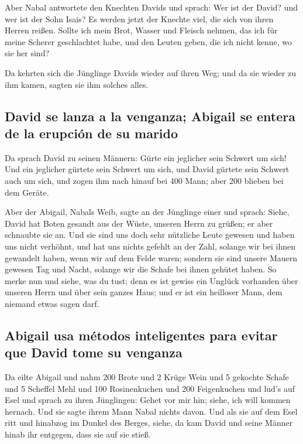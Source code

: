  Aber Nabal antwortete den Knechten Davids und sprach:
Wer ist der David? und wer ist der Sohn Isais? Es werden jetzt der
Knechte viel, die sich von ihren Herren reißen.  Sollte
ich mein Brot, Wasser und Fleisch nehmen, das ich für meine Scherer
geschlachtet habe, und den Leuten geben, die ich nicht kenne, wo sie her
sind?

 Da kehrten sich die Jünglinge Davids wieder auf ihren
Weg; und da sie wieder zu ihm kamen, sagten sie ihm solches alles.

\hypertarget{david-se-lanza-a-la-venganza-abigail-se-entera-de-la-erupciuxf3n-de-su-marido}{%
\subsection{David se lanza a la venganza; Abigail se entera de la
erupción de su
marido}\label{david-se-lanza-a-la-venganza-abigail-se-entera-de-la-erupciuxf3n-de-su-marido}}

 Da sprach David zu seinen Männern: Gürte ein jeglicher
sein Schwert um sich! Und ein jeglicher gürtete sein Schwert um sich,
und David gürtete sein Schwert auch um sich, und zogen ihm nach hinauf
bei 400 Mann; aber 200 blieben bei dem Geräte.

 Aber der Abigail, Nabals Weib, sagte an der Jünglinge
einer und sprach: Siehe, David hat Boten gesandt aus der Wüste, unseren
Herrn zu grüßen; er aber schnaubte sie an.  Und sie sind
uns doch sehr nützliche Leute gewesen und haben uns nicht verhöhnt, und
hat uns nichts gefehlt an der Zahl, solange wir bei ihnen gewandelt
haben, wenn wir auf dem Felde waren;  sondern sie sind
unsere Mauern gewesen Tag und Nacht, solange wir die Schafe bei ihnen
gehütet haben.  So merke nun und siehe, was du tust; denn
es ist gewiss ein Unglück vorhanden über unseren Herrn und über sein
ganzes Haus; und er ist ein heilloser Mann, dem niemand etwas sagen
darf.

\hypertarget{abigail-usa-muxe9todos-inteligentes-para-evitar-que-david-tome-su-venganza}{%
\subsection{Abigail usa métodos inteligentes para evitar que David tome
su
venganza}\label{abigail-usa-muxe9todos-inteligentes-para-evitar-que-david-tome-su-venganza}}

 Da eilte Abigail und nahm 200 Brote und 2 Krüge Wein und
5 gekochte Schafe und 5 Scheffel Mehl und 100 Rosinenkuchen und 200
Feigenkuchen und lud's auf Esel  und sprach zu ihren
Jünglingen: Gehet vor mir hin; siehe, ich will kommen hernach. Und sie
sagte ihrem Mann Nabal nichts davon.  Und als sie auf dem
Esel ritt und hinabzog im Dunkel des Berges, siehe, da kam David und
seine Männer hinab ihr entgegen, dass sie auf sie stieß.

